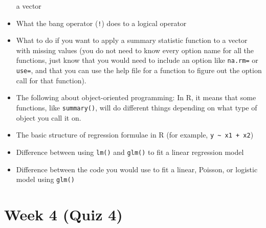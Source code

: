 \documentclass[]{book}
\begin{document}
\begin{itemize}
  a vector
\item
  What the bang operator (\texttt{!}) does to a logical operator
\item
  What to do if you want to apply a summary statistic function to a
  vector with missing values (you do not need to know every option name
  for all the functions, just know that you would need to include an
  option like \texttt{na.rm=} or \texttt{use=}, and that you can use the
  help file for a function to figure out the option call for that
  function).
\item
  The following about object-oriented programming: In R, it means that
  some functions, like \texttt{summary()}, will do different things
  depending on what type of object you call it on.
\item
  The basic structure of regression formulae in R (for example,
  \texttt{y\ \textasciitilde{}\ x1\ +\ x2})
\item
  Difference between using \texttt{lm()} and \texttt{glm()} to fit a
  linear regression model
\item
  Difference between the code you would use to fit a linear, Poisson, or
  logistic model using \texttt{glm()}
\end{itemize}

\section{Week 4 (Quiz 4)}\label{week-4-quiz-4}
\end{document}

